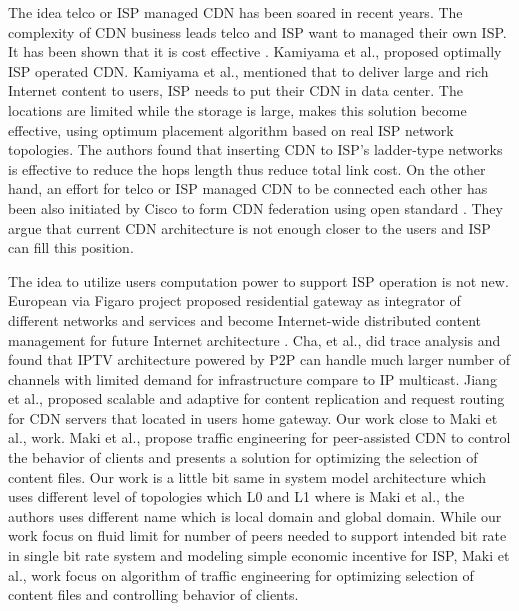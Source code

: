 \documentclass[paper]{ieice}
\begin{document}
The idea telco or ISP managed CDN has been soared in recent years.  
The complexity of CDN business leads telco and ISP want to managed their own ISP.
It has been shown that it is cost effective \cite{federation}\cite{norton2011internet}. 
Kamiyama et al., \cite{NoriakiKAMIYAMA2013} proposed optimally ISP operated CDN. 
Kamiyama et al., mentioned that to deliver large and rich Internet content to users, ISP needs to put their CDN in data center.
The locations are limited while the storage is large, makes this solution become effective, using optimum placement algorithm based on real ISP network topologies.
The authors found that inserting CDN to ISP's ladder-type networks is effective to reduce the hops length thus reduce total link cost. 
On the other hand, an effort for telco or ISP managed CDN to be connected each other has been also initiated by Cisco to form CDN federation \cite{federation} using open standard \cite{cdni}.
They argue that current CDN architecture is not enough closer to the users and ISP can fill this position.   

The idea to utilize users computation power to support ISP operation is not new.  
European via Figaro project \cite{figaro} proposed residential gateway as integrator of different networks and services and become Internet-wide distributed content management for future Internet architecture \cite{figaro}. 
Cha, et al.,\cite{Cha:2008:NTP:1855641.1855646} did trace analysis and found that IPTV architecture powered by P2P can handle much larger number of channels with limited demand for infrastructure compare to IP multicast. 
Jiang et al., \cite{Jiang:2012:OMD:2413176.2413193} proposed scalable and adaptive for content replication and request routing for CDN servers that located in users home gateway. 
Our work close to Maki et al.,\cite{NaoyaMAKI2012} work.  
Maki et al.,\cite{NaoyaMAKI2012} propose traffic engineering for peer-assisted CDN to control the behavior of clients and presents a solution for optimizing the selection of content files.
Our work is a little bit same in system model architecture which uses different level of topologies which L0 and L1 where is Maki et al., \cite{NaoyaMAKI2012} the authors uses different name which is local domain and global domain. 
While our work focus on fluid limit for number of peers needed to support intended bit rate in single bit rate system and modeling simple economic incentive for ISP, Maki et al., \cite{NaoyaMAKI2012} work focus on algorithm of traffic engineering for optimizing selection of content files and controlling behavior of clients.
\end{document}
